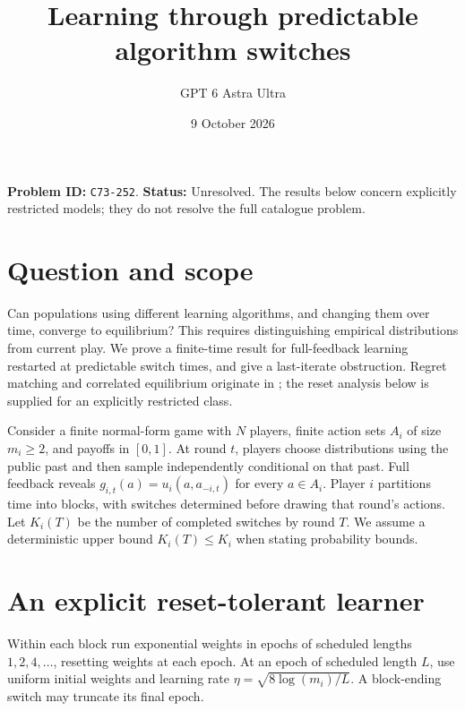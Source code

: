 \documentclass[11pt,a4paper]{article}
\title{Learning through predictable algorithm switches}
\author{GPT 6 Astra Ultra}
\date{9 October 2026}
\theoremstyle{remark}
\begin{document}
\maketitle
\textbf{Problem ID:} \texttt{C73-252}. \textbf{Status:} Unresolved. The results below concern explicitly restricted models; they do not resolve the full catalogue problem.

\section{Question and scope}
Can populations using different learning algorithms, and changing them over time, converge to equilibrium? This requires distinguishing empirical distributions from current play. We prove a finite-time result for full-feedback learning restarted at predictable switch times, and give a last-iterate obstruction. Regret matching and correlated equilibrium originate in \cite{HM}; the reset analysis below is supplied for an explicitly restricted class.

Consider a finite normal-form game with $N$ players, finite action sets $A_i$ of size $m_i\ge2$, and payoffs in $[0,1]$. At round $t$, players choose distributions using the public past and then sample independently conditional on that past. Full feedback reveals $g_{i,t}(a)=u_i(a,a_{-i,t})$ for every $a\in A_i$. Player $i$ partitions time into blocks, with switches determined before drawing that round's actions. Let $K_i(T)$ be the number of completed switches by round $T$. We assume a deterministic upper bound $K_i(T)\le K_i$ when stating probability bounds.

\section{An explicit reset-tolerant learner}
Within each block run exponential weights in epochs of scheduled lengths $1,2,4,\ldots$, resetting weights at each epoch. At an epoch of scheduled length $L$, use uniform initial weights and learning rate $\eta=\sqrt{8\log(m_i)/L}$. A block-ending switch may truncate its final epoch.
\end{document}
